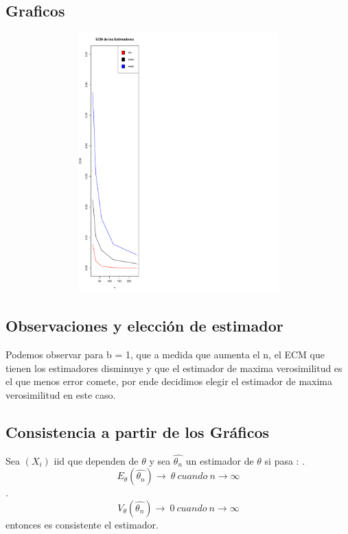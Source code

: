 \documentclass[a4paper]{article}
\begin{document}
\subsection{Graficos}
\begin{figure}[H]
	\centering
	\includegraphics[width=15cm, height=10cm]{Ejercicio-7-plot}
\end{figure}

\subsection{Observaciones y elección de estimador}
Podemos observar para b = 1, que a medida que aumenta el n, el ECM  que tienen los estimadores disminuye y que el estimador de maxima verosimilitud es el que menos error comete, por ende decidimos elegir el estimador de maxima verosimilitud en este caso.   

\subsection{Consistencia a partir de los Gráficos}
Sea  $(X_{i}) $ iid que dependen de $\theta$ y sea $\hat{\theta_{n}}$ un estimador de $\theta$ si pasa : . \[E_{\theta}{(\hat{\theta_{n}})} \rightarrow \ \theta \ cuando \ n \rightarrow \infty \] . \[V_{\theta}{(\hat{\theta_{n}})} \rightarrow \ 0 \ cuando \ n \rightarrow \infty \] \newline
entonces es consistente el estimador. \newline
  
\end{document}
